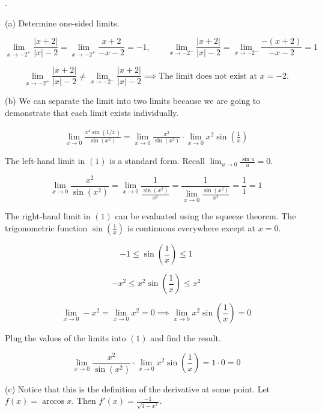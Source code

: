 \documentclass{article}
\begin{document}
.

\hfill

\noindent (a) Determine one-sided limits.

\[\lim_{x\to-2^+}\frac{\left|x+2\right|}{\left|x\right|-2}=\lim_{x\to-2^+}\frac{x+2}{-x-2}=-1,\quad\quad\lim_{x\to-2^-}\frac{\left|x+2\right|}{\left|x\right|-2}=\lim_{x\to-2^-}\frac{-(x+2)}{-x-2}=1\]

\[\lim_{x\to-2^+}\frac{\left|x+2\right|}{\left|x\right|-2}\neq\lim_{x\to-2^-}\frac{\left|x+2\right|}{\left|x\right|-2}\implies\boxed{\text{The limit does not exist at }x=-2.}\]

\hfill

\noindent (b) We can separate the limit into two limits because we are going to demonstrate that each limit exists individually.

\begin{align}\lim_{x\to0}\frac{x^4\sin(1/x)}{\sin\left(x^2\right)}=\lim_{x\to0}\frac{x^2}{\sin\left(x^2\right)}\cdot\lim_{x\to0}x^2\sin\left(\frac1x\right)\end{align}

\hfill

\noindent The left-hand limit in $(1)$ is a standard form. Recall $\displaystyle\lim_{u\to0}\frac{\sin u}u=0$.

\[\lim_{x\to0}\frac{x^2}{\sin\left(x^2\right)}=\lim_{x\to0}\frac1{\displaystyle\frac{\sin\left(x^2\right)}{x^2}}=\frac1{\displaystyle\lim_{x\to 0}\frac{\sin\left(x^2\right)}{x^2}}=\frac11=1\]

\hfill

\noindent The right-hand limit in $(1)$ can be evaluated using the squeeze theorem. The trigonometric function $\displaystyle\sin\left(\frac1x\right)$ is continuous everywhere except at $x=0$.

\[-1\leq\sin\left(\frac1x\right)\leq1\]

\[-x^2\leq x^2\sin\left(\frac1x\right)\leq x^2\]

\[\lim_{x\to0}-x^2=\lim_{x\to0}x^2=0\implies\lim_{x\to0}x^2\sin\left(\frac1x\right)=0\]

\hfill

\noindent Plug the values of the limits into $(1)$ and find the result.

\[\lim_{x\to0}\frac{x^2}{\sin\left(x^2\right)}\cdot\lim_{x\to0}x^2\sin\left(\frac1x\right)=1\cdot0=\boxed0\]

\hfill

\noindent (c) Notice that this is the definition of the derivative at some point. Let $f(x)=\arccos x$. Then $\displaystyle f'(x) =\frac{-1}{\sqrt{1-x^2}}$.
\end{document}
